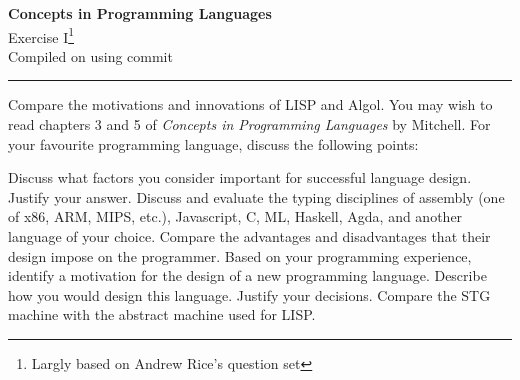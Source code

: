 \documentclass{supervision}
\begin{document}
	
\newcommand{\course}{Concepts in Programming Languages}
\newcommand{\week}{I}
\newcommand{\topics}{}

\begin{center}
\LARGE {\textbf{\color{campurpledark} \course} }\\[-0.2cm]
\Large \color{campurpledark} Exercise \week\footnote{Largly based on Andrew Rice's question set}\\
{
	\footnotesize Compiled on  using commit 
}
\end{center}

{\color{campurple}\hrule}

\newcommand{\terminal}[1]{\texttt{\color{campurple}#1}}
\newcommand{\bl}[1]{{\color{black}#1}}

\vspace{0.5cm}


\begin{questions}

\question Compare the motivations and innovations of LISP and Algol. You may wish to read chapters 3 and 5 of \textit{Concepts in Programming Languages} by Mitchell.
\question For your favourite programming language, discuss the following points:
\question Discuss what factors you consider important for successful language design. Justify your answer.
\question Discuss and evaluate the typing disciplines of assembly (one of x86, ARM, MIPS, etc.), Javascript, C, ML, Haskell, Agda, and another language of your choice. Compare the advantages and disadvantages that their design impose on the programmer.
\question Based on your programming experience, identify a motivation for the design of a new programming language. Describe how you would design this language. Justify your decisions.
\question Compare the STG machine with the abstract machine used for LISP. 
\end{questions}
\end{document}
